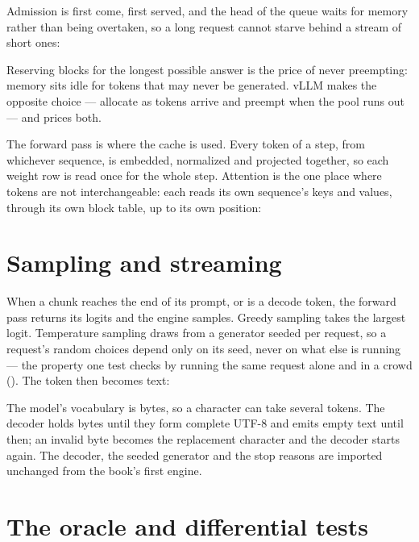 Admission is first come, first served, and the head of the queue waits for
memory rather than being overtaken, so a long request cannot starve behind a
stream of short ones:


Reserving blocks for the longest possible answer is the price of never
preempting: memory sits idle for tokens that may never be generated. vLLM makes
the opposite choice --- allocate as tokens arrive and preempt when the pool runs
out --- and  prices both.

The forward pass is where the cache is used. Every token of a step, from
whichever sequence, is embedded, normalized and projected together, so each
weight row is read once for the whole step. Attention is the one place where
tokens are not interchangeable: each reads its own sequence's keys and values,
through its own block table, up to its own position:


\section{Sampling and streaming}

When a chunk reaches the end of its prompt, or is a decode token, the forward
pass returns its logits and the engine samples. Greedy sampling takes the
largest logit. Temperature sampling draws from a generator seeded per request,
so a request's random choices depend only on its seed, never on what else is
running --- the property one test checks by running the same request alone and
in a crowd (). The token then becomes text:


The model's vocabulary is bytes, so a character can take several tokens. The
decoder holds bytes until they form complete UTF-8 and emits empty text until
then; an invalid byte becomes the replacement character and the decoder starts
again. The decoder, the seeded generator and the stop reasons are imported
unchanged from the book's first engine.

\section{The oracle and differential tests}

